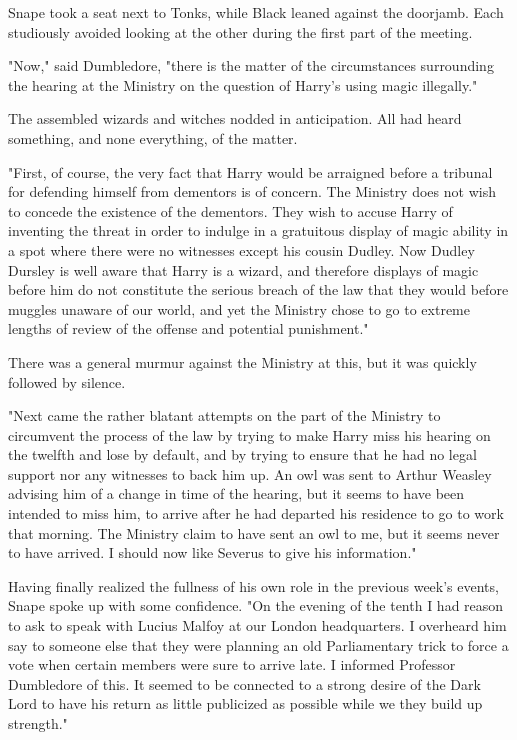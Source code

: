 Snape took a seat next to Tonks, while Black leaned against the doorjamb. Each studiously avoided looking at the other during the first part of the meeting.

"Now," said Dumbledore, "there is the matter of the circumstances surrounding the hearing at the Ministry on the question of Harry's using magic illegally."

The assembled wizards and witches nodded in anticipation. All had heard something, and none everything, of the matter.

"First, of course, the very fact that Harry would be arraigned before a tribunal for defending himself from dementors is of concern. The Ministry does not wish to concede the existence of the dementors. They wish to accuse Harry of inventing the threat in order to indulge in a gratuitous display of magic ability in a spot where there were no witnesses except his cousin Dudley. Now Dudley Dursley is well aware that Harry is a wizard, and therefore displays of magic before him do not constitute the serious breach of the law that they would before muggles unaware of our world, and yet the Ministry chose to go to extreme lengths of review of the offense and potential punishment."

There was a general murmur against the Ministry at this, but it was quickly followed by silence.

"Next came the rather blatant attempts on the part of the Ministry to circumvent the process of the law by trying to make Harry miss his hearing on the twelfth and lose by default, and by trying to ensure that he had no legal support nor any witnesses to back him up. An owl was sent to Arthur Weasley advising him of a change in time of the hearing, but it seems to have been intended to miss him, to arrive after he had departed his residence to go to work that morning. The Ministry claim to have sent an owl to me, but it seems never to have arrived. I should now like Severus to give his information."

Having finally realized the fullness of his own role in the previous week's events, Snape spoke up with some confidence. "On the evening of the tenth I had reason to ask to speak with Lucius Malfoy at our{\el} London headquarters. I overheard him say to someone else that they were planning an old Parliamentary trick to force a vote when certain members were sure to arrive late. I informed Professor Dumbledore of this. It seemed to be connected to a strong desire of the Dark Lord to have his return as little publicized as possible while we{\el} they build up strength."

